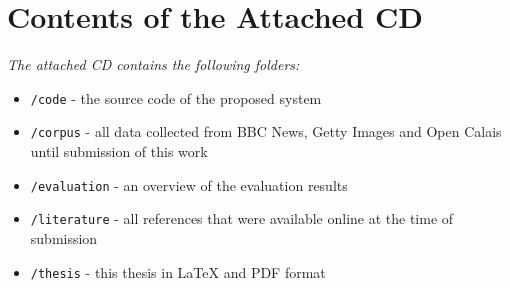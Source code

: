 \documentclass[11pt,a4paper,twoside]{article}
\begin{document}

\cleardoublepage
\fancyhead[LE,RO,LO,RE]{} %
\section*{Contents of the Attached CD}

\emph{The attached CD contains the following folders:}

\begin{itemize}
    \item \lstinline{/code} - the source code of the proposed system
    \item \lstinline{/corpus} - all data collected from BBC News, Getty Images and Open Calais until submission of this work
    \item \lstinline{/evaluation} - an overview of the evaluation results
    \item \lstinline{/literature} - all references that were available online at the time of submission
    \item \lstinline{/thesis} - this thesis in LaTeX and PDF format
\end{itemize}


\cleardoublepage










\end{document}
